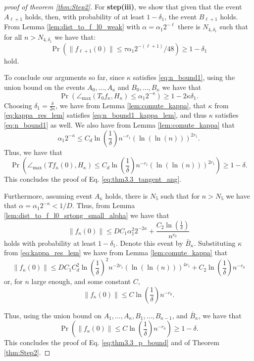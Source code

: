 \documentclass[12pt]{article}
\theoremstyle{remark}
\newcommand{\maxangle}{\angle_{\max}}
\begin{document}
\begin{proof}[proof of theorem \ref{thm:Step2}]
For \textbf{step(iii)}, we show that given that the event $A_{\ell+1}$ holds, then, with probability of at least $1-\delta_1$, the event $B_{\ell+1}$ holds. From Lemma \ref{lem:dist_to_f_l0_weak} with  $\alpha = \alpha_1 2^{-\ell}$ there is $N_{4,\delta_1}$ such that for all $n>N_{4,\delta_1}$ we have that:
\[
\Pr\left(\|f_{\ell+1}(0)\| \leq \tau \alpha_1 2^{-(\ell+1)}/48\right) \geq 1-\delta_1
\]
hold. 

To conclude our arguments so far, since $\kappa$ satisfies \eqref{eq:n_bound1}, using the union bound on the events $A_0,\ldots, A_\kappa$ and  $B_0,\ldots, B_\kappa$  we have that 
\begin{equation}\label{eq:final_prob_bound1}
\Pr\left(\maxangle (T_0 f_{\kappa}, H_{\kappa}) \leq \alpha_1 2^{-\kappa}\right) \geq 1 -  2\kappa\delta_1.        
\end{equation}
Choosing $\delta_1 = \frac{\delta}{2\kappa}$, we have from Lemma \ref{lem:comute_kappa}, that $\kappa$ from \eqref{eq:kappa_res_lem} satisfies \eqref{eq:n_bound1_kappa_lem}, and thus $\kappa$ satisfies \eqref{eq:n_bound1} as well. We also have from Lemma \ref{lem:comute_kappa} that 
 \[
    \alpha_1 2^{-\kappa} \leq C_{d} \ln\left(\frac{1}{\delta}\right) n^{-r_1}\left(\ln\left(\ln(n) \right)\right)^{2r_1}.
    \]
Thus, we have that 
\begin{equation}
\Pr\left(\maxangle (Tf_{\kappa}(0), H_{\kappa}) \leq C_{d}\ln\left(\frac{1}{\delta}\right) n^{-r_1}\left(\ln\left(\ln(n) \right)\right)^{2r_1}\right) \geq 1-\delta.    
\end{equation}
This concludes the proof of Eq. \eqref{eq:thm3.3_tangent_ang}. 


Furthermore, assuming event $A_\kappa$ holds, there is $N_5$ such that for $n>N_{5}$ we have that $\alpha = \alpha_1 2^{-\kappa}<1/D$. Thus, from Lemma \ref{lem:dist_to_f_l0_srtong_small_alpha} we have that  
\[
\|f_\kappa(0)\| \leq DC_1 \alpha_1^2 2^{-2\kappa} + \frac{C_2\ln\left(\frac{1}{\delta}\right)}{n^{r_0}}
\]
holds with probability at least $1-\delta_1$. 
Denote this event by $\bar{B}_\kappa$.
Substituting $\kappa$ from \eqref{eq:kappa_res_lem} we have from Lemma \ref{lem:comute_kappa} that 
\[
\| f_\kappa(0)\| \leq D C_1 C_{d}^2 \ln\left(\frac{1}{\delta}\right)^2 n^{-2r_1}\left(\ln\left(\ln(n) \right)\right)^{4r_1} + C_2\ln\left(\frac{1}{\delta}\right)n^{-r_0}
\]
or, for $n$ large enough, and some constant $C$,
\[
\|f_\kappa(0)\| \leq C \ln\left(\frac{1}{\delta}\right) n^{-r_0}.
\]

Thus, using the union bound on $A_1,\ldots, A_\kappa, B_1,\ldots, B_{\kappa-1}$, and $\bar{B}_\kappa$, we have that 
\begin{equation}
\Pr\left(  \|f_\kappa(0)\| \leq C\ln\left(\frac{1}{\delta}\right) n^{-r_0}   \right) \geq 1-\delta.    
\end{equation}
This concludes the proof of Eq. \eqref{eq:thm3.3_p_bound} and of Theorem \ref{thm:Step2}. 



\end{proof}
\end{document}
